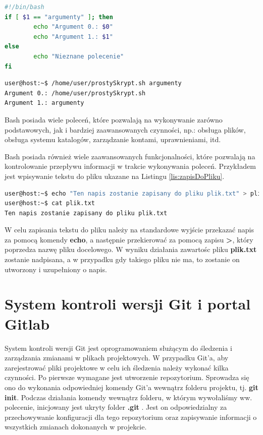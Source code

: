 \begin{lstlisting}[label={lst:prostySkrypt},language=bash,caption={Skrypt wykorzystujący argumenty wejściowe, instrukcję warunkową oraz polecenie echo}]
#!/bin/bash
if [ $1 == "argumenty" ]; then
        echo "Argument 0.: $0"
        echo "Argument 1.: $1"
else
        echo "Nieznane polecenie"
fi
\end{lstlisting}

\begin{lstlisting}[language=bash,caption={Przykład działania Skryptu z Listingu \ref{lst:prostySkrypt}}]
user@host:~$ /home/user/prostySkrypt.sh argumenty
Argument 0.: /home/user/prostySkrypt.sh
Argument 1.: argumenty
\end{lstlisting}

Bash posiada wiele poleceń, które pozwalają na wykonywanie zarówno podstawowych, jak i bardziej zaawansowanych czynności, np.: obsługa plików, obsługa systemu katalogów, zarządzanie kontami, uprawnieniami, itd.\par
Bash posiada również wiele zaawansowanych funkcjonalności, które pozwalają na kontrolowanie przepływu informacji w trakcie wykonywania poleceń. Przykładem jest wpisywanie tekstu do pliku ukazane na Listingu \ref{lis:zapisDoPliku}.

\begin{lstlisting}[label={lis:zapisDoPliku},language=bash,caption={Przykład zapisu tekstu do pliku}]
user@host:~$ echo "Ten napis zostanie zapisany do pliku plik.txt" > plik.txt
user@host:~$ cat plik.txt
Ten napis zostanie zapisany do pliku plik.txt
\end{lstlisting}

W celu zapisania tekstu do pliku należy na standardowe wyjście przekazać napis za pomocą komendy \textbf{echo}, a następnie przekierować za pomocą zapisu \textbf{>}, który poprzedza nazwę pliku docelowego. W wyniku działania zawartośc pliku \textbf{plik.txt} zostanie nadpisana, a w przypadku gdy takiego pliku nie ma, to zostanie on utworzony i uzupełniony o napis.\par


\section{System kontroli wersji Git i portal Gitlab}
System kontroli wersji Git jest oprogramowaniem służącym do śledzenia i zarządzania zmianami w plikach projektowych. W przypadku Git'a, aby zarejestrować pliki projektowe w celu ich śledzenia należy wykonać kilka czynności. Po pierwsze wymagane jest utworzenie repozytorium. Sprowadza się ono do wykonania odpowiedniej komendy Git'a wewnątrz folderu projektu, tj. \textbf{git init}. Podczas działania komendy wewnątrz folderu, w którym wywołaliśmy ww. polecenie, inicjowany jest ukryty folder \textbf{.git}
. Jest on odpowiedzialny za przechowywanie konfiguracji dla tego repozytorium oraz zapisywanie informacji o wszystkich zmianach dokonanych w projekcie.

